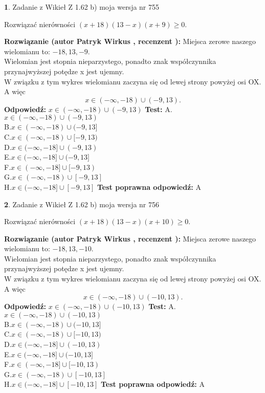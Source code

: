 \documentclass[12pt, a4paper]{article}
\theoremstyle{definition} %
\newtheorem{zad}{}
\newcommand{\zadStart}[1]{\begin{zad}#1\newline}
\newcommand{\zadStop}{\end{zad}}
\newcommand{\rozwStart}[2]{\noindent \textbf{Rozwiązanie (autor #1 , recenzent #2): }\newline}
\newcommand{\rozwStop}{\newline}
\newcommand{\odpStart}{\noindent \textbf{Odpowiedź:}\newline}
\newcommand{\odpStop}{\newline}
\newcommand{\testStart}{\noindent \textbf{Test:}\newline}
\newcommand{\testStop}{\newline}
\newcommand{\kluczStart}{\noindent \textbf{Test poprawna odpowiedź:}\newline}
\newcommand{\kluczStop}{\newline}
\begin{document}
\zadStart{Zadanie z Wikieł Z 1.62 b) moja wersja nr 755}

Rozwiązać nierówności $(x+18)(13-x)(x+9)\ge0$.
\zadStop
\rozwStart{Patryk Wirkus}{}
Miejsca zerowe naszego wielomianu to: $-18, 13, -9$.\\
Wielomian jest stopnia nieparzystego, ponadto znak współczynnika przy\linebreak najwyższej potędze x jest ujemny.\\ W związku z tym wykres wielomianu zaczyna się od lewej strony powyżej osi OX. A więc $$x \in (-\infty,-18) \cup (-9,13).$$
\rozwStop
\odpStart
$x \in (-\infty,-18) \cup (-9,13)$
\odpStop
\testStart
A.$x \in (-\infty,-18) \cup (-9,13)$\\
B.$x \in (-\infty,-18) \cup (-9,13]$\\
C.$x \in (-\infty,-18) \cup [-9,13)$\\
D.$x \in (-\infty,-18] \cup (-9,13)$\\
E.$x \in (-\infty,-18] \cup (-9,13]$\\
F.$x \in (-\infty,-18] \cup [-9,13)$\\
G.$x \in (-\infty,-18) \cup [-9,13]$\\
H.$x \in (-\infty,-18] \cup [-9,13]$
\testStop
\kluczStart
A
\kluczStop



\zadStart{Zadanie z Wikieł Z 1.62 b) moja wersja nr 756}

Rozwiązać nierówności $(x+18)(13-x)(x+10)\ge0$.
\zadStop
\rozwStart{Patryk Wirkus}{}
Miejsca zerowe naszego wielomianu to: $-18, 13, -10$.\\
Wielomian jest stopnia nieparzystego, ponadto znak współczynnika przy\linebreak najwyższej potędze x jest ujemny.\\ W związku z tym wykres wielomianu zaczyna się od lewej strony powyżej osi OX. A więc $$x \in (-\infty,-18) \cup (-10,13).$$
\rozwStop
\odpStart
$x \in (-\infty,-18) \cup (-10,13)$
\odpStop
\testStart
A.$x \in (-\infty,-18) \cup (-10,13)$\\
B.$x \in (-\infty,-18) \cup (-10,13]$\\
C.$x \in (-\infty,-18) \cup [-10,13)$\\
D.$x \in (-\infty,-18] \cup (-10,13)$\\
E.$x \in (-\infty,-18] \cup (-10,13]$\\
F.$x \in (-\infty,-18] \cup [-10,13)$\\
G.$x \in (-\infty,-18) \cup [-10,13]$\\
H.$x \in (-\infty,-18] \cup [-10,13]$
\testStop
\kluczStart
A
\kluczStop
\end{document}
